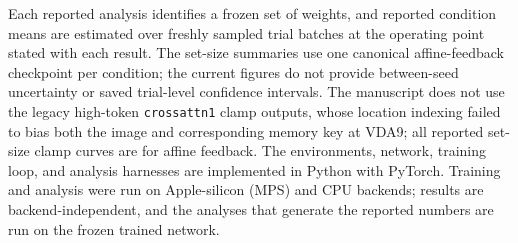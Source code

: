 Each reported analysis identifies a frozen set of weights, and reported condition
means are estimated over freshly sampled trial batches at the operating point stated
with each result. The set-size summaries use one canonical affine-feedback checkpoint per condition;
the current figures do not provide between-seed uncertainty or saved trial-level
confidence intervals. The manuscript does not use the legacy high-token
\texttt{crossattn1} clamp outputs, whose location indexing failed to bias both the
image and corresponding memory key at VDA9; all reported set-size clamp curves are
for affine feedback. The environments, network,
training loop, and analysis harnesses are implemented in Python with
PyTorch. Training and analysis were run on Apple-silicon (MPS) and CPU
backends; results are backend-independent, and the analyses that generate
the reported numbers are run on the frozen trained network.
